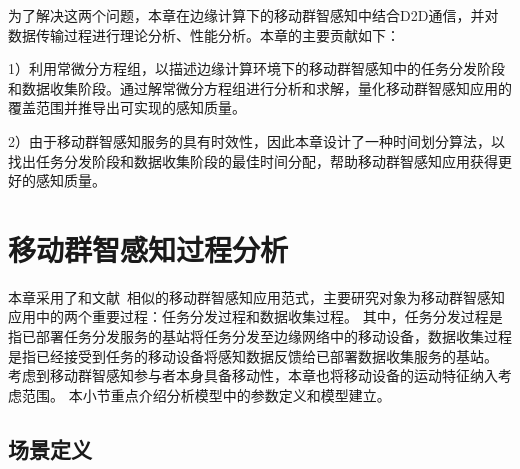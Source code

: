 为了解决这两个问题，本章在边缘计算下的移动群智感知中结合D2D通信，并对数据传输过程进行理论分析、性能分析。本章的主要贡献如下：

1）利用常微分方程组，以描述边缘计算环境下的移动群智感知中的任务分发阶段和数据收集阶段。通过解常微分方程组进行分析和求解，量化移动群智感知应用的覆盖范围并推导出可实现的感知质量。

2）由于移动群智感知服务的具有时效性，因此本章设计了一种时间划分算法，以找出任务分发阶段和数据收集阶段的最佳时间分配，帮助移动群智感知应用获得更好的感知质量。


\section{移动群智感知过程分析}


本章采用了和文献~\cite{DBLP:journals/tpds/ZhaoMTL15}相似的移动群智感知应用范式，主要研究对象为移动群智感知应用中的两个重要过程：任务分发过程和数据收集过程。
其中，任务分发过程是指已部署任务分发服务的基站将任务分发至边缘网络中的移动设备，数据收集过程是指已经接受到任务的移动设备将感知数据反馈给已部署数据收集服务的基站。
考虑到移动群智感知参与者本身具备移动性，本章也将移动设备的运动特征纳入考虑范围。
本小节重点介绍分析模型中的参数定义和模型建立。

\subsection{场景定义}


